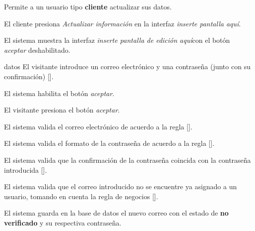 %
%

{
  Permite a un usuario tipo \textbf{cliente} actualizar sus datos.

  \begin{trayectoriaPrincipal}

    \item El cliente presiona \textit{Actualizar información} en la
      interfaz \textit{inserte pantalla aquí}.

    \item El sistema muestra la interfaz
      \textit{inserte pantalla de edición aquí}con el botón \textit{aceptar}
      deshabilitado.

    \item[datos] El visitante introduce un correo electrónico y una contraseña
      (junto con su confirmación) [].

    \item El sistema habilita el botón \textit{aceptar}.

    \item El visitante presiona el botón \textit{aceptar}.

    \item El sistema valida el correo electrónico de acuerdo a la regla
      [].

    \item El sistema valida el formato de la contraseña de acuerdo a la regla
      [].

    \item El sistema valida que la confirmación de la contraseña coincida con
      la contraseña introducida
      [].

    \item El sistema valida que el correo introducido no se encuentre ya
      asignado a un usuario, tomando en cuenta la regla de negocios
      [].

    \item El sistema guarda en la base de datos el nuevo correo con el estado
      de \textbf{no verificado} y su respectiva contraseña.


\end{trayectoriaPrincipal}}
